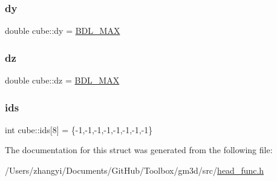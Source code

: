 \mbox{\label{structcube_a8afa605328f4d86b6b352c879bb72345}} 
\subsubsection{\texorpdfstring{dy}{dy}}
{\footnotesize\ttfamily double cube\+::dy = \mbox{\hyperlink{head__func_8h_a171f39ecf5d0b8067fd66e19e82f334d}{B\+D\+L\+\_\+\+M\+AX}}}

\mbox{\label{structcube_a30cf2dabf20ae0c9fda30970c6808a3d}} 
\subsubsection{\texorpdfstring{dz}{dz}}
{\footnotesize\ttfamily double cube\+::dz = \mbox{\hyperlink{head__func_8h_a171f39ecf5d0b8067fd66e19e82f334d}{B\+D\+L\+\_\+\+M\+AX}}}

\mbox{\label{structcube_ab7fb6cd932d5fcc229aef51535913172}} 
\subsubsection{\texorpdfstring{ids}{ids}}
{\footnotesize\ttfamily int cube\+::ids\mbox{[}8\mbox{]} = \{-\/1,-\/1,-\/1,-\/1,-\/1,-\/1,-\/1,-\/1\}}



The documentation for this struct was generated from the following file\+:\begin{DoxyCompactItemize}
\item 
/\+Users/zhangyi/\+Documents/\+Git\+Hub/\+Toolbox/gm3d/src/\mbox{\hyperlink{head__func_8h}{head\+\_\+func.\+h}}\end{DoxyCompactItemize}
